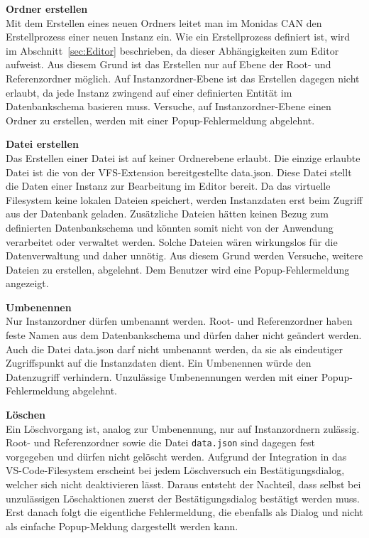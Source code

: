 \textbf{Ordner erstellen}\\
Mit dem Erstellen eines neuen Ordners leitet man im Monidas CAN den Erstellprozess einer neuen Instanz ein. Wie ein Erstellprozess definiert ist, wird im Abschnitt~\ref{sec:Editor} beschrieben, da dieser Abhängigkeiten zum Editor aufweist. Aus diesem Grund ist das Erstellen nur auf Ebene der Root- und Referenzordner möglich. Auf Instanzordner-Ebene ist das Erstellen dagegen nicht erlaubt, da jede Instanz zwingend auf einer definierten Entität im Datenbankschema basieren muss. Versuche, auf Instanzordner-Ebene einen Ordner zu erstellen, werden mit einer Popup-Fehlermeldung abgelehnt.

\textbf{Datei erstellen}\\
Das Erstellen einer Datei ist auf keiner Ordnerebene erlaubt. Die einzige erlaubte Datei ist die von der VFS-Extension bereitgestellte data.json. Diese Datei stellt die Daten einer Instanz zur Bearbeitung im Editor bereit. Da das virtuelle Filesystem keine lokalen Dateien speichert, werden Instanzdaten erst beim Zugriff aus der Datenbank geladen. Zusätzliche Dateien hätten keinen Bezug zum definierten Datenbankschema und könnten somit nicht von der Anwendung verarbeitet oder verwaltet werden. Solche Dateien wären wirkungslos für die Datenverwaltung und daher unnötig. Aus diesem Grund werden Versuche, weitere Dateien zu erstellen, abgelehnt. Dem Benutzer wird eine Popup-Fehlermeldung angezeigt.

\textbf{Umbenennen}\\
Nur Instanzordner dürfen umbenannt werden. Root- und Referenzordner haben feste Namen aus dem Datenbankschema und dürfen daher nicht geändert werden. Auch die Datei data.json darf nicht umbenannt werden, da sie als eindeutiger Zugriffspunkt auf die Instanzdaten dient. Ein Umbenennen würde den Datenzugriff verhindern. Unzulässige Umbenennungen werden mit einer Popup-Fehlermeldung abgelehnt.


\textbf{Löschen}\\
Ein Löschvorgang ist, analog zur Umbenennung, nur auf Instanzordnern zulässig. Root- und Referenzordner sowie die Datei \texttt{data.json} sind dagegen fest vorgegeben und dürfen nicht gelöscht werden. Aufgrund der Integration in das VS-Code-Filesystem erscheint bei jedem Löschversuch ein Bestätigungsdialog, welcher sich nicht deaktivieren lässt. Daraus entsteht der Nachteil, dass selbst bei unzulässigen Löschaktionen zuerst der Bestätigungsdialog bestätigt werden muss. Erst danach folgt die eigentliche Fehlermeldung, die ebenfalls als Dialog und nicht als einfache Popup-Meldung dargestellt werden kann.

